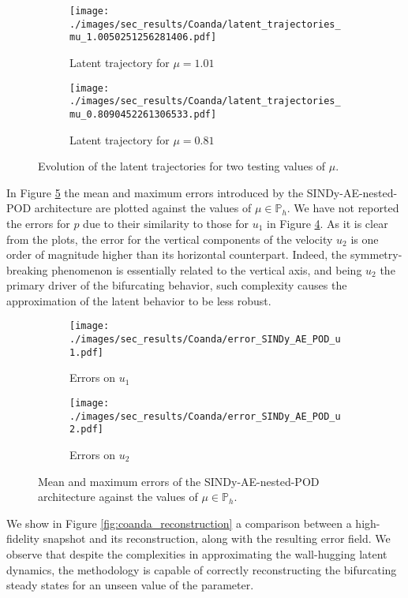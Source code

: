 \documentclass[reqno]{amsart}[standalone]
\theoremstyle{definition}
\theoremstyle{remark}
\begin{document}
\begin{figure}[htbp]
\centering
\begin{subfigure}{\linewidth}
\centering
\texttt{[image: ./images/sec\_results/Coanda/latent\_trajectories\_mu\_1.0050251256281406.pdf]}
\caption{Latent trajectory for $\mu=1.01$}
\label{latentMU_PREBIF}
\end{subfigure}

\vspace{0.5cm}

\begin{subfigure}{\linewidth}
\centering
\texttt{[image: ./images/sec\_results/Coanda/latent\_trajectories\_mu\_0.8090452261306533.pdf]}
\caption{Latent trajectory for $\mu=0.81$}
\label{latentMU_BIF}
\end{subfigure}
\caption{Evolution of the latent trajectories for two testing values of $\mu$.}
\label{fig:latent_coanda}
\end{figure}

In Figure \ref{fig:coanda_error} the mean and maximum errors introduced by the SINDy-AE-nested-POD architecture are plotted against the values of $\mu\in\mathbb{P}_h$. We have not reported the errors for $p$ due to their similarity to those for $u_1$ in Figure \ref{fig:err_u1}. As it is clear from the plots, the error for the vertical components of the velocity $u_2$ is one order of magnitude higher than its horizontal counterpart. Indeed, the symmetry-breaking phenomenon is essentially related to the vertical axis, and being $u_2$ the primary driver of the bifurcating behavior, such complexity causes the approximation of the latent behavior to be less robust.

\begin{figure}[htbp]
\begin{subfigure}{0.49\linewidth}
\centering
\texttt{[image: ./images/sec\_results/Coanda/error\_SINDy\_AE\_POD\_u1.pdf]}
\caption{Errors on $u_1$}
\label{fig:err_u1}
\end{subfigure}
\hfill
\begin{subfigure}{0.49\linewidth}
\centering
\texttt{[image: ./images/sec\_results/Coanda/error\_SINDy\_AE\_POD\_u2.pdf]}
\caption{Errors on $u_2$}
\end{subfigure}
\caption{Mean and maximum errors of the SINDy-AE-nested-POD architecture against the values of $\mu\in\mathbb{P}_h$.}
\label{fig:coanda_error}
\end{figure}

We show in Figure \ref{fig:coanda_reconstruction} a comparison between a high-fidelity snapshot and its reconstruction, along with the resulting error field. We observe that despite the complexities in approximating the wall-hugging latent dynamics, the methodology is capable of correctly reconstructing the bifurcating steady states for an unseen value of the parameter.
\end{document}
